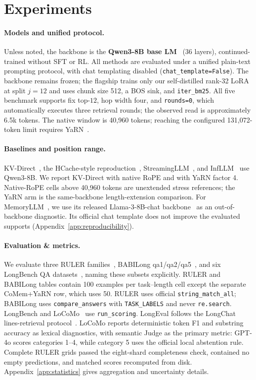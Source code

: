 \section{Experiments}
\label{sec:experiments}

\paragraph{Models and unified protocol.} Unless noted, the backbone is the
\textbf{Qwen3-8B base LM}~\citep{qwen3} (36 layers), continued-trained without
SFT or RL. All methods are evaluated under a unified plain-text prompting
protocol, with chat templating disabled (\texttt{chat\_template=False}). The
backbone remains frozen; the flagship trains only our self-distilled rank-32
LoRA at split $j{=}12$ and uses chunk size 512, a BOS sink, and
\texttt{iter\_bm25}. All five benchmark supports fix top-$12$, hop width four,
and \texttt{rounds=0}, which automatically executes three retrieval rounds; the
observed read is approximately 6.5k tokens. The native window is 40,960 tokens;
reaching the configured 131,072-token limit requires YaRN~\citep{yarn}.

\paragraph{Baselines and position range.} KV-Direct~\citep{kvdirect}, the
HCache-style reproduction~\citep{hcache}, StreamingLLM~\citep{streamingllm}, and
InfLLM~\citep{infllm} use Qwen3-8B. We report KV-Direct with native RoPE and with
YaRN factor 4. Native-RoPE cells above 40,960 tokens are unextended stress
references; the YaRN arm is the same-backbone length-extension comparison. For
MemoryLLM~\citep{memoryllm}, we use its released Llama-3-8B-chat
backbone~\citep{llama3} as an out-of-backbone diagnostic. Its official chat
template does not improve the evaluated supports
(Appendix~\ref{app:reproducibility}).

\paragraph{Evaluation \& metrics.} We evaluate three RULER
families~\citep{ruler}, BABILong qa1/qa2/qa5~\citep{babilong}, and six LongBench
QA datasets~\citep{longbench}, naming these subsets explicitly. RULER and
BABILong tables contain 100 examples per task--length cell except the separate
CoMem+YaRN row, which uses 50. RULER uses official
\texttt{string\_match\_all}; BABILong uses \texttt{compare\_answers} with
\texttt{TASK\_LABELS} and never \texttt{re.search}. LongBench and
LoCoMo~\citep{locomo} use \texttt{run\_scoring}. LongEval follows the LongChat
lines-retrieval protocol~\citep{longchat}. LoCoMo reports deterministic token F1
and substring accuracy as lexical diagnostics, with semantic Judge as the
primary metric: GPT-4o scores categories 1--4, while category 5 uses the official
local abstention rule. Complete RULER grids passed the eight-shard completeness
check, contained no empty predictions, and matched scores recomputed from disk.
Appendix~\ref{app:statistics} gives aggregation and uncertainty details.

